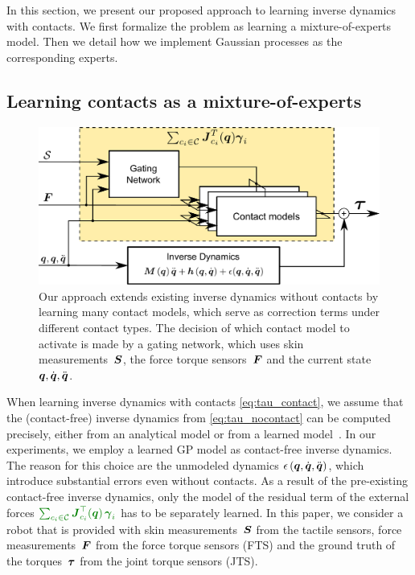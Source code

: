 In this section, we present our proposed approach to learning inverse dynamics with contacts.
We first formalize the problem as learning a mixture-of-experts model.
Then we detail how we implement Gaussian processes as the corresponding experts.


\subsection{Learning contacts as a mixture-of-experts}
	\begin{figure}[t]
		\centering
		\includegraphics[width =.98\linewidth]{fig/diagram_2.pdf}
		\caption{Our approach extends existing inverse dynamics without contacts by learning many contact models, which serve as correction terms under different contact types. The decision of which contact model to activate is made by a gating network, which uses skin measurements~$\mathcal{\boldsymbol S}$, the force torque sensors~$\boldsymbol {F}$ and the current state $\boldsymbol q, \dot{\boldsymbol q}, \ddot{\boldsymbol q}$.}
		\label{fig:model}
        \figspace
	\end{figure}
	When learning inverse dynamics with contacts \eq\eqref{eq:tau_contact}, we assume that the (contact-free) inverse dynamics from \eq\eqref{eq:tau_nocontact} can be computed precisely, either from an analytical model or from a learned model~\cite{Nguyen-Tuong2011}.
    In our experiments, we employ a learned GP model as contact-free inverse dynamics.
    The reason for this choice are the unmodeled dynamics $\epsilon\,(\boldsymbol q,\dot{\boldsymbol q},\ddot{\boldsymbol q})$, which introduce substantial errors even without contacts.
	As a result of the pre-existing contact-free inverse dynamics, only the model of the residual term of the external forces $\color{darkgreen}{\sum_{c_i \in\mathcal{C}} {\jacobian\T_{c_i}(\q)}\, \extForces_i}$ has to be separately learned.
    In this paper, we consider a robot that is provided with skin measurements~$\mathcal{\boldsymbol S}$ from the tactile sensors, force measurements~$\boldsymbol {F}$ from the force torque sensors (FTS) and the ground truth of the torques~$\boldsymbol {\tau}$ from the joint torque sensors (JTS).
